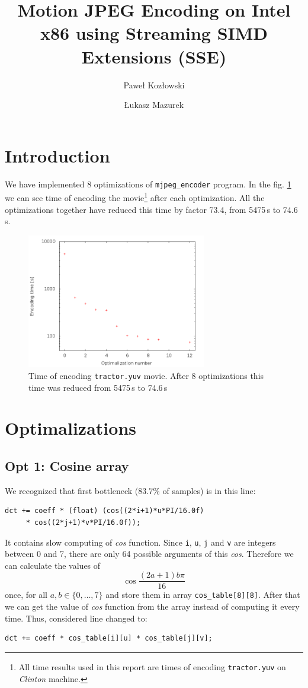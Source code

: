 \documentclass[11pt]{article}
\title{Motion JPEG Encoding on Intel x86 using Streaming SIMD Extensions (SSE)}
\author{Paweł Kozłowski \and Łukasz Mazurek}
\begin{document}
\maketitle

\section{Introduction}
We have implemented 8 optimizations of \texttt{mjpeg\_encoder} program.
In the fig. \ref{times_plot} we can see time of encoding the movie\footnote{All time results used in this report are times of encoding \texttt{tractor.yuv} on \emph{Clinton} machine.} after each optimization.
All the optimizations together have reduced this time by factor 73.4, from 5475\,s to 74.6\,s.

\begin{figure}[h]
	\centering
	\includegraphics[width=0.7\textwidth]{img/times.png}
	\caption{Time of encoding \texttt{tractor.yuv} movie. After 8 optimizations this time was reduced from 5475\,s to 74.6\,s}
	\label{times_plot}
\end{figure}


\section{Optimalizations}
\subsection{Opt 1: Cosine array}
We recognized that first bottleneck (83.7\% of samples) is in this line:

\begin{lstlisting}
dct += coeff * (float) (cos((2*i+1)*u*PI/16.0f) 
     * cos((2*j+1)*v*PI/16.0f));
\end{lstlisting}
It contains slow computing of \emph{cos} function.
Since \texttt{i}, \texttt{u}, \texttt{j} and \texttt{v} are integers between 0 and 7, there are only 64 possible arguments of this \emph{cos}.
Therefore we can calculate the values of 
$$\cos \frac{(2a + 1) b \pi}{16}$$
once, for all $a, b \in \{0, \ldots, 7 \}$ and store them in array \texttt{cos\_table[8][8]}.
After that we can get the value of \emph{cos} function from the array instead of computing it every time.
Thus, considered line changed to:
\begin{lstlisting}
dct += coeff * cos_table[i][u] * cos_table[j][v];
\end{lstlisting}
\end{document}
